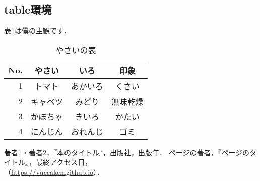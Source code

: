 \documentclass[uplatex,dvipdfmx]{vkaishi}
\begin{document}
\subsection{table環境}
表\ref{tbl:vegetable}は僕の主観です．
\begin{table}[htbp]
  \centering
  \caption{やさいの表}
  \label{tbl:vegetable}
  \begin{tabular}{r|ccc} \hline
    No. & やさい & いろ & 印象 \\ \hline
    1 & トマト & あかいろ & くさい \\
    2 & キャベツ & みどり & 無味乾燥 \\
    3 & かぼちゃ & きいろ & かたい \\
    4 & にんじん & おれんじ & ゴミ \\ \hline
  \end{tabular}
\end{table}

\begin{thebibliography}{99}
   著者1・著者2，『本のタイトル』，出版社，出版年．
   ページの著者，『ページのタイトル』，最終アクセス日，\\
    （\url{https://vuccaken.github.io}）．
\end{thebibliography}
\end{document}
